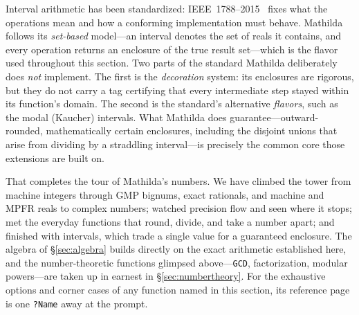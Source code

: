 Interval arithmetic has been standardized: IEEE~1788--2015~\cite{ieee1788}
fixes what the operations mean and how a conforming implementation must behave. Mathilda
follows its \emph{set-based} model---an interval denotes the set of reals it contains,
and every operation returns an enclosure of the true result set---which is the flavor
used throughout this section. Two parts of the standard Mathilda deliberately does
\emph{not} implement. The first is the \emph{decoration}
system: its
enclosures are rigorous, but they do not carry a tag certifying that every intermediate
step stayed within its function's domain. The second is the standard's alternative
\emph{flavors}, such as the modal (Kaucher) intervals. What Mathilda does
guarantee---outward-rounded, mathematically certain enclosures, including the disjoint
unions that arise from dividing by a straddling interval---is precisely the common core
those extensions are built on.

That completes the tour of Mathilda's numbers. We have climbed the tower from machine
integers through GMP bignums, exact rationals, and machine and MPFR reals to complex
numbers; watched precision flow and seen where it stops; met the everyday functions that
round, divide, and take a number apart; and finished with intervals, which trade a
single value for a guaranteed enclosure. The algebra of \S\ref{sec:algebra} builds
directly on the exact arithmetic established here, and the number-theoretic functions
glimpsed above---\texttt{GCD}, factorization, modular powers---are taken up in earnest in
\S\ref{sec:numbertheory}. For the exhaustive options and corner cases of any function
named in this section, its reference page is one \texttt{?Name} away at the prompt.
